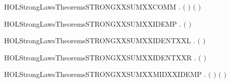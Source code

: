 \newcommand{\HOLStrongLawsTheoremsSTRONGXXSUMXXASSOCXXR}{\UseVerbatim{HOLStrongLawsTheoremsSTRONGXXSUMXXASSOCXXR}}
\begin{SaveVerbatim}{HOLStrongLawsTheoremsSTRONGXXSUMXXCOMM}
\HOLTokenTurnstile{} \HOLSymConst{\HOLTokenForall{}} .  \ensuremath{(} \HOLSymConst{\ensuremath{+}} \ensuremath{)} \ensuremath{(} \HOLSymConst{\ensuremath{+}} \ensuremath{)}
\end{SaveVerbatim}
\newcommand{\HOLStrongLawsTheoremsSTRONGXXSUMXXCOMM}{\UseVerbatim{HOLStrongLawsTheoremsSTRONGXXSUMXXCOMM}}
\begin{SaveVerbatim}{HOLStrongLawsTheoremsSTRONGXXSUMXXIDEMP}
\HOLTokenTurnstile{} \HOLSymConst{\HOLTokenForall{}}.  \ensuremath{(} \HOLSymConst{\ensuremath{+}} \ensuremath{)} 
\end{SaveVerbatim}
\newcommand{\HOLStrongLawsTheoremsSTRONGXXSUMXXIDEMP}{\UseVerbatim{HOLStrongLawsTheoremsSTRONGXXSUMXXIDEMP}}
\begin{SaveVerbatim}{HOLStrongLawsTheoremsSTRONGXXSUMXXIDENTXXL}
\HOLTokenTurnstile{} \HOLSymConst{\HOLTokenForall{}}.  \ensuremath{(} \HOLSymConst{\ensuremath{+}} \ensuremath{)} 
\end{SaveVerbatim}
\newcommand{\HOLStrongLawsTheoremsSTRONGXXSUMXXIDENTXXL}{\UseVerbatim{HOLStrongLawsTheoremsSTRONGXXSUMXXIDENTXXL}}
\begin{SaveVerbatim}{HOLStrongLawsTheoremsSTRONGXXSUMXXIDENTXXR}
\HOLTokenTurnstile{} \HOLSymConst{\HOLTokenForall{}}.  \ensuremath{(} \HOLSymConst{\ensuremath{+}} \ensuremath{)} 
\end{SaveVerbatim}
\newcommand{\HOLStrongLawsTheoremsSTRONGXXSUMXXIDENTXXR}{\UseVerbatim{HOLStrongLawsTheoremsSTRONGXXSUMXXIDENTXXR}}
\begin{SaveVerbatim}{HOLStrongLawsTheoremsSTRONGXXSUMXXMIDXXIDEMP}
\HOLTokenTurnstile{} \HOLSymConst{\HOLTokenForall{}} .  \ensuremath{(} \HOLSymConst{\ensuremath{+}}  \HOLSymConst{\ensuremath{+}} \ensuremath{)} \ensuremath{(} \HOLSymConst{\ensuremath{+}} \ensuremath{)}
\end{SaveVerbatim}
